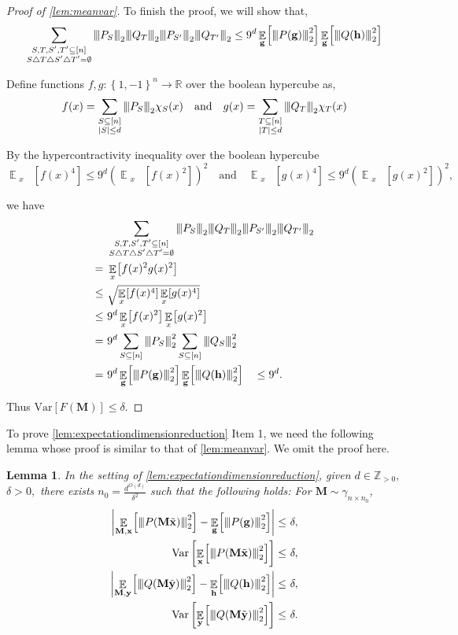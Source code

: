 \documentclass[11pt]{article}
\theoremstyle{plain}
\newtheorem{lemma}[theorem]{Lemma}
\theoremstyle{definition}
\newcommand {\minusspace} {\: \! \!}
\newcommand {\Fn} [2] {\ensuremath{ #1 \minusspace \Br{ #2 } }}
\newcommand{\reals}{{\mathbb R}}
\newcommand {\set} [1] {\ensuremath{ \left\lbrace #1 \right\rbrace }}
\newcommand {\br} [1] {\ensuremath{ \left( #1 \right) }}
\newcommand {\Br} [1] {\ensuremath{ \left[ #1 \right] }}
\newcommand {\ab} [1] {\ensuremath{ \left| #1 \right| }}
\DeclareMathOperator*{\bigE}{\mathbb{E}}
\newcommand {\expec} [2] {\Fn{\bigE_{\substack{#1}}}{#2}}
\newcommand{\nnorm}[1]{{\left\vert\kern-0.25ex\left\vert\kern-0.25ex\left\vert #1
		\right\vert\kern-0.25ex\right\vert\kern-0.25ex\right\vert}}
\newcommand{\posint}{{\mathbb Z}_{>0}}
\newcommand{\randg}{\ensuremath{\mathbf{g}}}
\newcommand{\randh}{\ensuremath{\mathbf{h}}}
\newcommand{\randx}{\ensuremath{\mathbf{x}}}
\newcommand{\randy}{\ensuremath{\mathbf{y}}}
\newcommand{\randM}{\ensuremath{\mathbf{M}}}
\newcommand {\var} [1] {\mathrm{Var}\Br{#1}}
\newcommand{\1}{\mathbb{1}} %
\begin{document}
\begin{proof}[Proof of \cref{lem:meanvar}]
To finish the proof, we will show that,
\[\sum_{\substack{S,T,S',T'\subseteq[n]\\ S\bigtriangleup T\bigtriangleup S'\bigtriangleup T'=\emptyset}}\nnorm{ P_S}_2\nnorm{ Q_T}_2\nnorm{ P_{S'}}_2\nnorm{ Q_{T'}}_2\leq9^d\expec{\randg}{\nnorm{P(\randg)}_2^2}\expec{\randg}{\nnorm{Q(\randh)}_2^2}\]

Define functions $f,g:\set{1,-1}^n\rightarrow\reals$ over the boolean hypercube as,
\[f(x)=\sum_{\substack{S\subseteq[n]\\\ab{S}\leq d}}\nnorm{ P_S}_2\chi_S(x)\quad\text{and}\quad g(x)=\sum_{\substack{T\subseteq[n]\\\ab{T}\leq d}}\nnorm{ Q_T}_2\chi_T(x)\]

By the hypercontractivity inequality over the boolean hypercube \cite[Page 240]{Odonnell08}
\[\expec{x}{f(x)^4}\leq9^d\br{\expec{x}{f(x)^2}}^2\quad\text{and}\quad\expec{x}{g(x)^4}\leq9^d\br{\expec{x}{g(x)^2}}^2,\]

we have
\begin{align*}
&\sum_{\substack{S,T,S',T'\subseteq[n]\\ S\bigtriangleup T\bigtriangleup S'\bigtriangleup T'=\emptyset}}\nnorm{ P_S}_2\nnorm{ Q_T}_2\nnorm{ P_{S'}}_2\nnorm{ Q_{T'}}_2\\
=~&\expec{x}{f(x)^2g(x)^2}\\
\leq~&\sqrt{\expec{x}{f(x)^4}\expec{x}{g(x)^4}}\\
\leq~&9^d\expec{x}{f(x)^2}\expec{x}{g(x)^2}\\
=~&9^d\sum_{S\subseteq[n]}\nnorm{ P_S}_2^2\sum_{S\subseteq[n]}\nnorm{ Q_S}_2^2\\
=~&9^d\expec{\randg}{\nnorm{P(\randg)}_2^2}\expec{\randg}{\nnorm{Q(\randh)}_2^2}\quad \leq9^d.
\end{align*}

Thus $\var{F(\mathbf{M})}\leq\delta.$
\end{proof}

To prove \cref{lem:expectationdimensionreduction} Item 1, we need the following lemma whose proof is similar to that of \cref{lem:meanvar}. We omit the proof here.

\begin{lemma}\label{lem:normmeanvar}
In the setting of \cref{lem:expectationdimensionreduction}, given $d\in\posint,$ $\delta>0,$ there exists $n_0=\frac{d^{O(d)}}{\delta^2}$ such that the following holds: For $\mathbf{M}\sim\gamma_{n\times n_0}$,
\begin{align*}
\ab{\expec{\randM,\randx}{\nnorm{P(\randM\tilde{\randx})}_2^2}-\expec{\randg}{\nnorm{P(\randg)}_2^2}}\leq~&\delta,\\
\var{\expec{\randx}{\nnorm{P(\randM\tilde{\randx})}_2^2}}\leq~&\delta,\\
\ab{\expec{\randM,\randy}{\nnorm{Q(\randM\tilde{\randy})}_2^2}-\expec{\randh}{\nnorm{Q(\randh)}_2^2}}\leq~&\delta,\\
\var{\expec{\randy}{\nnorm{Q(\randM\tilde{\randy})}_2^2}}\leq~&\delta.
\end{align*}
\end{lemma}
\end{document}
